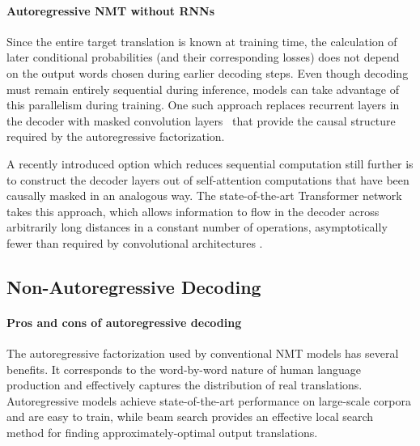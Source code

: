 \documentclass{article} %
\begin{document}
\vspace{-5pt}
\paragraph{Autoregressive NMT without RNNs}
Since the entire target translation is known at training time, the calculation of later conditional probabilities (and their corresponding losses) does not depend on the output words chosen during earlier decoding steps. Even though decoding must remain entirely sequential during inference, models can take advantage of this parallelism during training.
One such approach replaces recurrent layers in the decoder with masked convolution layers~\citep{kalchbrenner2016neural, gehring2017convolutional} that provide the causal structure required by the autoregressive factorization.

A recently introduced option which reduces sequential computation still further is to construct the decoder layers out of self-attention computations that have been causally masked in an analogous way.
The state-of-the-art Transformer network takes this approach, which allows information to flow in the decoder across arbitrarily long distances in a constant number of operations, asymptotically fewer than required by convolutional architectures \citep{vaswani2017attention}.

\subsection{Non-Autoregressive Decoding}
\vspace{-5pt}
\paragraph{Pros and cons of autoregressive decoding}
The autoregressive factorization used by conventional NMT models has several benefits. It corresponds to the word-by-word nature of human language production and effectively captures the distribution of real translations. Autoregressive models achieve state-of-the-art performance on large-scale corpora and are easy to train, while beam search provides an effective local search method for finding approximately-optimal output translations.
\end{document}
